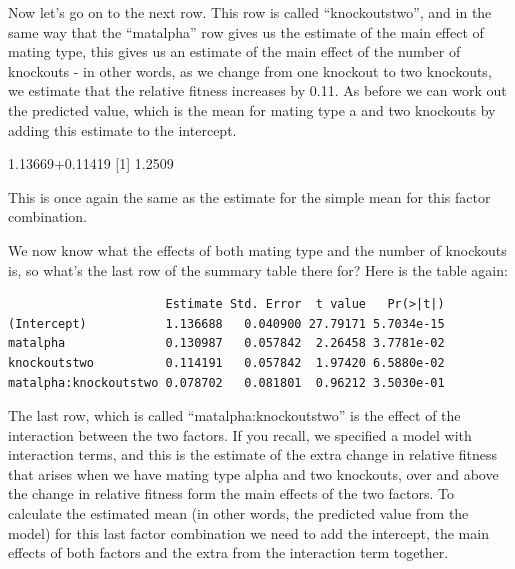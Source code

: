 \documentclass[
]{book}
\newenvironment{Shaded}{\begin{snugshade}}{\end{snugshade}}
\newcommand{\DecValTok}[1]{\textcolor[rgb]{0.00,0.00,0.81}{#1}}
\newcommand{\FloatTok}[1]{\textcolor[rgb]{0.00,0.00,0.81}{#1}}
\newcommand{\KeywordTok}[1]{\textcolor[rgb]{0.13,0.29,0.53}{\textbf{#1}}}
\newcommand{\NormalTok}[1]{#1}
\newcommand{\OperatorTok}[1]{\textcolor[rgb]{0.81,0.36,0.00}{\textbf{#1}}}
\newcommand{\StringTok}[1]{\textcolor[rgb]{0.31,0.60,0.02}{#1}}
\begin{document}
Now let's go on to the next row. This row is called ``knockoutstwo'', and in the same way that the ``matalpha'' row gives us the estimate of the main effect of mating type, this gives us an estimate of the main effect of the number of knockouts - in other words, as we change from one knockout to two knockouts, we estimate that the relative fitness increases by 0.11. As before we can work out the predicted value, which is the mean for mating type a and two knockouts by adding this estimate to the intercept.

\begin{Shaded}
\begin{Highlighting}[]
\FloatTok{1.13669+0.11419}
\NormalTok{[}\DecValTok{1}\NormalTok{] }\FloatTok{1.2509}
\end{Highlighting}
\end{Shaded}

This is once again the same as the estimate for the simple mean for this factor combination.

\begin{Shaded}
\end{Shaded}

We now know what the effects of both mating type and the number of knockouts is, so what's the last row of the summary table there for? Here is the table again:

\begin{verbatim}
                      Estimate Std. Error  t value   Pr(>|t|)
(Intercept)           1.136688   0.040900 27.79171 5.7034e-15
matalpha              0.130987   0.057842  2.26458 3.7781e-02
knockoutstwo          0.114191   0.057842  1.97420 6.5880e-02
matalpha:knockoutstwo 0.078702   0.081801  0.96212 3.5030e-01
\end{verbatim}

The last row, which is called ``matalpha:knockoutstwo'' is the effect of the interaction between the two factors. If you recall, we specified a model with interaction terms, and this is the estimate of the extra change in relative fitness that arises when we have mating type alpha and two knockouts, over and above the change in relative fitness form the main effects of the two factors. To calculate the estimated mean (in other words, the predicted value from the model) for this last factor combination we need to add the intercept, the main effects of both factors and the extra from the interaction term together.
\end{document}
